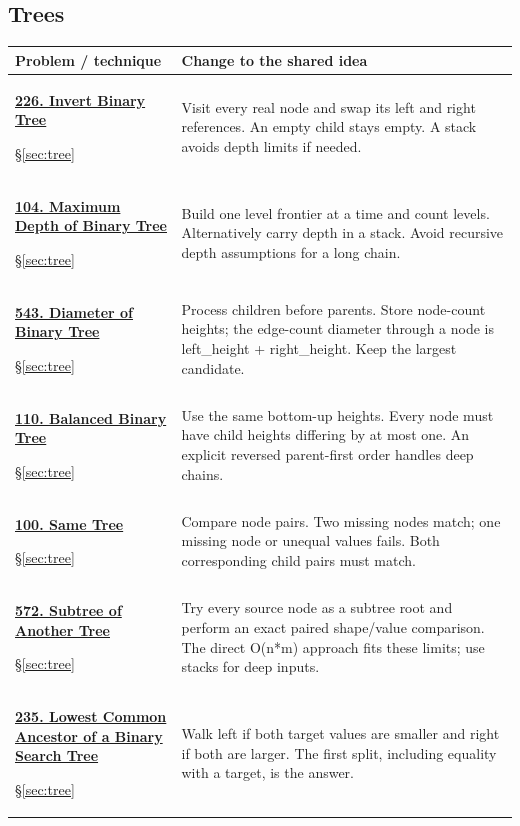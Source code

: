 \documentclass[11pt]{article}
\newcommand{\sect}[1]{\hyperref[sec:#1]{\S\ref*{sec:#1}}}
\begin{document}
\subsection{Trees}
\begin{longtable}{@{}L{4.3cm}L{11.7cm}@{}}
\toprule Problem / technique & Change to the shared idea \\ \midrule\endhead
\hypertarget{lc226}{}\href{https://leetcode.com/problems/invert-binary-tree/}{\textbf{226. Invert Binary Tree}}\par\sect{tree} & Visit every real node and swap its left and right references. An empty child stays empty. A stack avoids depth limits if needed.\\[4pt]
\hypertarget{lc104}{}\href{https://leetcode.com/problems/maximum-depth-of-binary-tree/}{\textbf{104. Maximum Depth of Binary Tree}}\par\sect{tree} & Build one level frontier at a time and count levels. Alternatively carry depth in a stack. Avoid recursive depth assumptions for a long chain.\\[4pt]
\hypertarget{lc543}{}\href{https://leetcode.com/problems/diameter-of-binary-tree/}{\textbf{543. Diameter of Binary Tree}}\par\sect{tree} & Process children before parents. Store node-count heights; the edge-count diameter through a node is left\_height + right\_height. Keep the largest candidate.\\[4pt]
\hypertarget{lc110}{}\href{https://leetcode.com/problems/balanced-binary-tree/}{\textbf{110. Balanced Binary Tree}}\par\sect{tree} & Use the same bottom-up heights. Every node must have child heights differing by at most one. An explicit reversed parent-first order handles deep chains.\\[4pt]
\hypertarget{lc100}{}\href{https://leetcode.com/problems/same-tree/}{\textbf{100. Same Tree}}\par\sect{tree} & Compare node pairs. Two missing nodes match; one missing node or unequal values fails. Both corresponding child pairs must match.\\[4pt]
\hypertarget{lc572}{}\href{https://leetcode.com/problems/subtree-of-another-tree/}{\textbf{572. Subtree of Another Tree}}\par\sect{tree} & Try every source node as a subtree root and perform an exact paired shape/value comparison. The direct O(n*m) approach fits these limits; use stacks for deep inputs.\\[4pt]
\hypertarget{lc235}{}\href{https://leetcode.com/problems/lowest-common-ancestor-of-a-binary-search-tree/}{\textbf{235. Lowest Common Ancestor of a Binary Search Tree}}\par\sect{tree} & Walk left if both target values are smaller and right if both are larger. The first split, including equality with a target, is the answer.\\[4pt]

\end{longtable}
\end{document}
